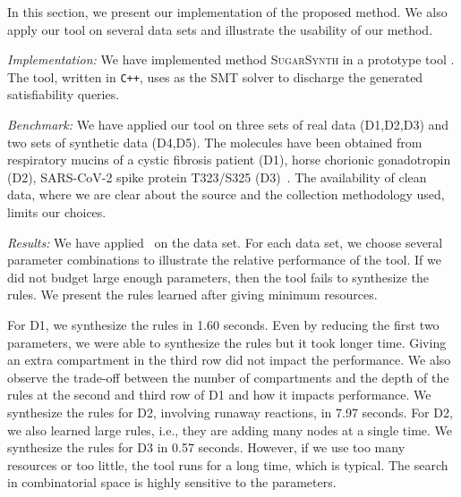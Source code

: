 In this section, we  present our implementation of the proposed method.
We also apply our tool on several data sets and illustrate the usability of our method.

{\em Implementation:} 
We have implemented method \textsc{SugarSynth} in a prototype tool {\ourtool}.
%
The tool, written in {\tt C++}, uses {\zthree}\cite{z3} as the SMT solver
to discharge the generated satisfiability queries.
%


{\em Benchmark: }
We have applied our tool on three sets of real data (D1,D2,D3) and two sets of synthetic data (D4,D5). The molecules have been obtained from
respiratory mucins of a cystic fibrosis patient (D1),
horse chorionic gonadotropin (D2), SARS-CoV-2 spike protein T323/S325 (D3)~\cite{Jaiman2018,10.1093/glycob/cwaa042}.
The availability of clean data, where we are clear about the source and the collection
methodology used, limits our choices.




{\em Results:} We have applied \ourtool~on the data set. For each data set, we choose several
parameter combinations to illustrate the relative performance of the tool.
If we did not budget large enough parameters, then the tool fails to
synthesize the rules.
We present the rules learned after giving minimum resources.

For D1, we synthesize the rules in 1.60 seconds. Even by reducing the first two parameters, we were able to synthesize the rules but it took longer time.
Giving an extra compartment in the third row did not impact the performance.  We also observe the trade-off between the number of compartments
and the depth of the rules at the second and third row of D1 and how it impacts performance.
We synthesize the rules for D2, involving runaway reactions,  in 7.97 seconds.
For D2, we also learned large rules, i.e., they are adding many nodes at a single time.
We synthesize the rules for D3 in 0.57 seconds. 
However, if we use too many resources or too little, the tool runs for a long time,
which is typical. The search in combinatorial space is highly sensitive to the parameters.

